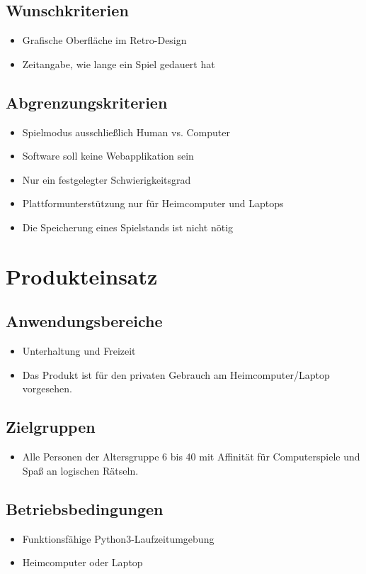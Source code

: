 \documentclass[paper=a4,fontsize=11pt,DIV14]{scrartcl}%
\numberwithin{equation}{section}
\begin{document}
\subsection{Wunschkriterien}
\begin{itemize}
	\item Grafische Oberfläche im Retro-Design
	\item Zeitangabe, wie lange ein Spiel gedauert hat
\end{itemize}
\subsection{Abgrenzungskriterien}
\begin{itemize}
	\item Spielmodus ausschließlich Human vs. Computer
	\item Software soll keine Webapplikation sein
	\item Nur ein festgelegter Schwierigkeitsgrad
	\item Plattformunterstützung nur für Heimcomputer und Laptops
	\item Die Speicherung eines Spielstands ist nicht nötig
\end{itemize}
\section{Produkteinsatz}
\subsection{Anwendungsbereiche}
\begin{itemize}
    \item Unterhaltung und Freizeit
    \item Das Produkt ist für den privaten Gebrauch am Heimcomputer/Laptop vorgesehen.
\end{itemize}
\subsection{Zielgruppen}
\begin{itemize}
    \item Alle Personen der Altersgruppe 6 bis 40 mit Affinität für Computerspiele und Spaß an logischen Rätseln.
\end{itemize}

\subsection{Betriebsbedingungen}
\begin{itemize}
    \item Funktionsfähige Python3-Laufzeitumgebung 
    \item Heimcomputer oder Laptop
\end{itemize}
\end{document}
